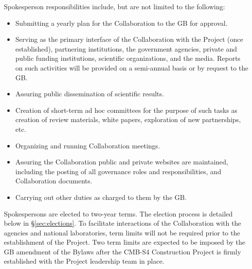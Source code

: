 \documentclass[12pt]{article}
\newcommand{\exec}{{Executive Team}}
\begin{document}
Spokesperson responsibilities include, but are not limited to the following: 
\begin{itemize}
\item Submitting a yearly plan for the Collaboration to the GB for approval. 
\item Serving as the primary interface of the Collaboration with the Project (once established), partnering institutions, the government agencies, private and public funding institutions, scientific organizations, and the media. Reports on such activities will be provided on a semi-annual basis or by request to the GB.
\item Assuring public dissemination of scientific results. 
\item Creation of short-term ad hoc committees for the purpose of such tasks as creation of review materials, white papers, exploration of new partnerships, etc.
\item Organizing and running Collaboration meetings. 

\item Assuring the Collaboration public and private websites are maintained, including the posting of all governance roles and responsibilities, and Collaboration documents. 

\item Carrying out other duties as charged to them by the GB. 



\end{itemize}

Spokespersons are elected to two-year terms. The election process is detailed below in \S\ref{sec:elections}.   To facilitate interactions of the Collaboration with the agencies and national laboratories, term limits will not be required prior to the establishment of the Project.  Two term limits are expected to be imposed by the GB amendment of the Bylaws after the CMB-S4 Construction Project is firmly established with the Project leadership team in place. 
\end{document}
